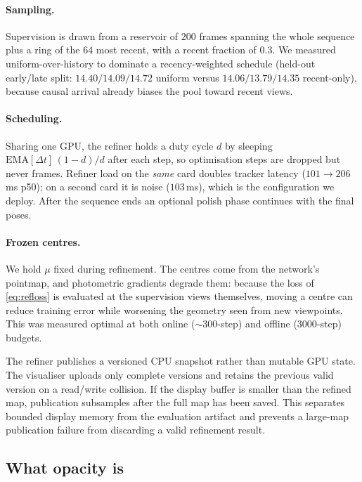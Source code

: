 \paragraph{Sampling.}
Supervision is drawn from a reservoir of $200$ frames spanning the whole
sequence plus a ring of the $64$ most recent, with a recent fraction of $0.3$.
We measured uniform-over-history to dominate a recency-weighted schedule
(held-out early/late split: $14.40/14.09/14.72$ uniform versus
$14.06/13.79/14.35$ recent-only), because causal arrival already biases the
pool toward recent views.

\paragraph{Scheduling.}
Sharing one GPU, the refiner holds a duty cycle $d$ by sleeping
$\mathrm{EMA}[\Delta t]\,(1-d)/d$ after each step, so optimisation steps are
dropped but never frames. Refiner load on the \emph{same} card doubles tracker
latency ($101\!\rightarrow\!206$\,ms p50); on a second card it is noise
($103$\,ms), which is the configuration we deploy. After the sequence ends an
optional polish phase continues with the final poses.

\paragraph{Frozen centres.}
We hold $\mu$ fixed during refinement. The centres come from the network's
pointmap, and photometric gradients degrade them: because the loss of
\cref{eq:refloss} is evaluated at the supervision views themselves, moving a
centre can reduce training error while worsening the geometry seen from new
viewpoints. This was measured optimal at both online ($\sim$300-step) and
offline (3000-step) budgets.

The refiner publishes a versioned CPU snapshot rather than mutable GPU state.
The visualiser uploads only complete versions and retains the previous valid
version on a read/write collision. If the display buffer is smaller than the
refined map, publication subsamples after the full map has been saved. This
separates bounded display memory from the evaluation artifact and prevents a
large-map publication failure from discarding a valid refinement result.

\subsection{What opacity is}
\label{sec:method:mech}

